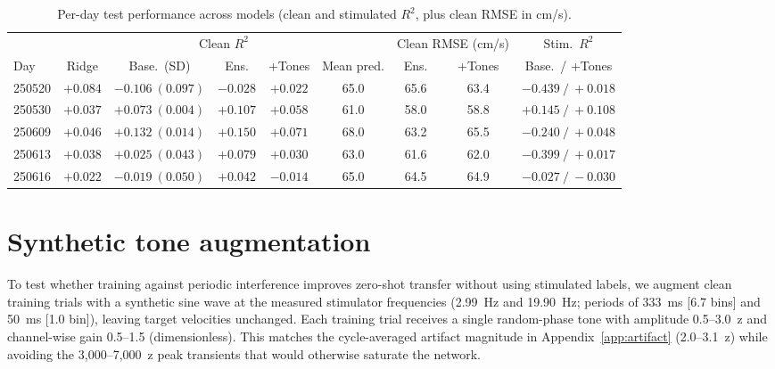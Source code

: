\documentclass[11pt]{article}
\begin{document}
\begin{table}[htbp]\centering
\caption{Per-day test performance across models (clean and stimulated $R^2$, plus clean RMSE in cm/s).}
\scriptsize
\setlength{\tabcolsep}{3pt}
\begin{tabular}{@{}lcccccccc@{}}\toprule
 & \multicolumn{5}{c}{Clean $R^2$} & \multicolumn{2}{c}{Clean RMSE (cm/s)} & Stim.\ $R^2$ \\
\cmidrule(lr){2-6}\cmidrule(lr){7-8}\cmidrule(lr){9-9}
Day & Ridge & Base.\ (SD) & Ens. & +Tones & Mean pred. & Ens. & +Tones & Base.\ / +Tones \\ \midrule
250520 & $+0.084$ & $-0.106\ (0.097)$ & $-0.028$ & $+0.022$ & 65.0 & 65.6 & 63.4 & $-0.439\ /\ +0.018$ \\
250530 & $+0.037$ & $+0.073\ (0.004)$ & $+0.107$ & $+0.058$ & 61.0 & 58.0 & 58.8 & $+0.145\ /\ +0.108$ \\
250609 & $+0.046$ & $+0.132\ (0.014)$ & $+0.150$ & $+0.071$ & 68.0 & 63.2 & 65.5 & $-0.240\ /\ +0.048$ \\
250613 & $+0.038$ & $+0.025\ (0.043)$ & $+0.079$ & $+0.030$ & 63.0 & 61.6 & 62.0 & $-0.399\ /\ +0.017$ \\
250616 & $+0.022$ & $-0.019\ (0.050)$ & $+0.042$ & $-0.014$ & 65.0 & 64.5 & 64.9 & $-0.027\ /\ -0.030$ \\
\bottomrule\end{tabular}\label{tab:perday}
\end{table}





\section{Synthetic tone augmentation}\label{app:tones}

To test whether training against periodic interference improves zero-shot transfer without using stimulated labels, we augment clean training trials with a synthetic sine wave at the measured stimulator frequencies (2.99~Hz and 19.90~Hz; periods of 333~ms [6.7 bins] and 50~ms [1.0 bin]), leaving target velocities unchanged. Each training trial receives a single random-phase tone with amplitude 0.5--3.0~z and channel-wise gain 0.5--1.5 (dimensionless). This matches the cycle-averaged artifact magnitude in Appendix~\ref{app:artifact} (2.0--3.1~z) while avoiding the 3{,}000--7{,}000~z peak transients that would otherwise saturate the network.
\end{document}
